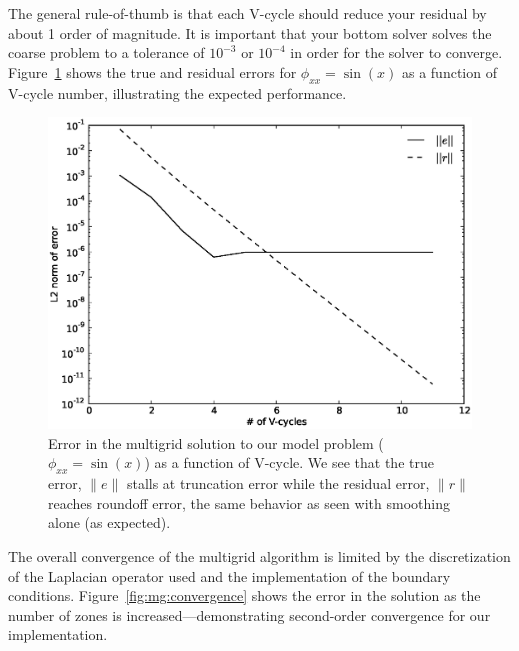 The general rule-of-thumb is that each V-cycle should reduce your
residual by about 1 order of magnitude.  It is important that your
bottom solver solves the coarse problem to a tolerance of $10^{-3}$ or
$10^{-4}$ in order for the solver to converge.  Figure~\ref{fig:mgerror}
shows the true and residual errors for $\phi_{xx} = \sin(x)$ as a function
of V-cycle number, illustrating the expected performance.


\begin{figure}
\centering
\includegraphics[width=0.85\linewidth]{mg_error_vs_cycle}
\caption[Error in solution as a function of multigrid V-cycle
  number.]{\label{fig:mgerror} Error in the multigrid solution to our
  model problem ($\phi_{xx} = \sin(x)$) as a function of V-cycle.  We
  see that the true error, $\|e\|$ stalls at truncation error while
  the residual error, $\|r\|$ reaches roundoff error, the same
  behavior as seen with smoothing alone (as expected). \\
  }
\end{figure}

The overall convergence of the multigrid algorithm is limited by the
discretization of the Laplacian operator used and the implementation
of the boundary conditions.  Figure~\ref{fig:mg:convergence} shows
the error in the solution as the number of zones is increased---demonstrating
second-order convergence for our implementation.

